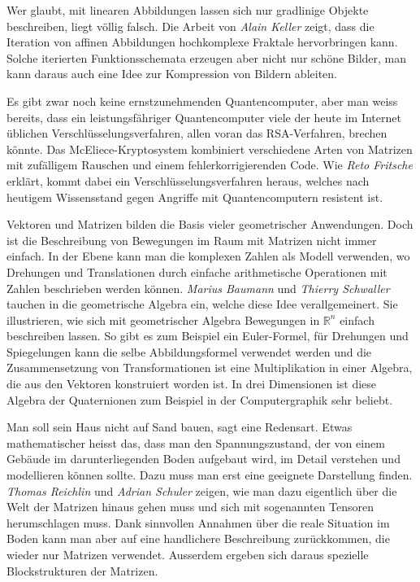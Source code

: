 Wer glaubt, mit linearen Abbildungen lassen sich nur gradlinige
Objekte beschreiben, liegt völlig falsch.
Die Arbeit von {\em Alain Keller} zeigt, dass die Iteration von
%
affinen Abbildungen hochkomplexe Fraktale hervorbringen kann.
Solche iterierten Funktionsschemata erzeugen aber nicht nur schöne
Bilder, man kann daraus auch eine Idee zur Kompression von
Bildern ableiten.

Es gibt zwar noch keine ernstzunehmenden Quantencomputer, aber man weiss
bereits, dass ein leistungsfähriger Quantencomputer viele der heute
im Internet üblichen Verschlüsselungsverfahren, allen voran das RSA-Verfahren,
brechen könnte.
Das McEliece-Kryptosystem kombiniert verschiedene Arten von Matrizen
mit zufälligem Rauschen und einem fehlerkorrigierenden Code.
Wie {\em Reto Fritsche} erklärt, kommt dabei ein Verschlüsselungsverfahren
%
heraus, welches nach heutigem Wissensstand gegen Angriffe mit
Quantencomputern resistent ist.

Vektoren und Matrizen bilden die Basis vieler geometrischer
Anwendungen.
Doch ist die Beschreibung von Bewegungen im Raum mit Matrizen nicht
immer einfach.
In der Ebene kann man die komplexen Zahlen als Modell verwenden,
wo Drehungen und Translationen durch einfache arithmetische
Operationen mit Zahlen beschrieben werden können.
{\em Marius Baumann} und {\em Thierry Schwaller} tauchen in die
%
%
geometrische Algebra ein, welche diese Idee verallgemeinert.
Sie illustrieren, wie sich mit geometrischer Algebra Bewegungen
in $\mathbb{R}^n$ einfach beschreiben lassen.
So gibt es zum Beispiel ein Euler-Formel, für Drehungen und Spiegelungen
kann die selbe Abbildungsformel verwendet werden und die Zusammensetzung
von Transformationen ist eine Multiplikation in einer Algebra, die
aus den Vektoren konstruiert worden ist.
In drei Dimensionen ist diese Algebra der Quaternionen zum Beispiel
in der Computergraphik sehr beliebt.

Man soll sein Haus nicht auf Sand bauen, sagt eine Redensart.
Etwas mathematischer heisst das, dass man den Spannungszustand,
der von einem Gebäude im darunterliegenden Boden aufgebaut wird,
im Detail verstehen und modellieren können sollte.
Dazu muss man erst eine geeignete Darstellung finden.
{\em Thomas Reichlin} und {\em Adrian Schuler} zeigen, wie man 
%
%
dazu eigentlich über die Welt der Matrizen hinaus gehen muss und
sich mit sogenannten Tensoren herumschlagen muss.
Dank sinnvollen Annahmen über die reale Situation im Boden
kann man aber auf eine handlichere Beschreibung zurückkommen,
die wieder nur Matrizen verwendet.
Ausserdem ergeben sich daraus spezielle Blockstrukturen der
Matrizen.


